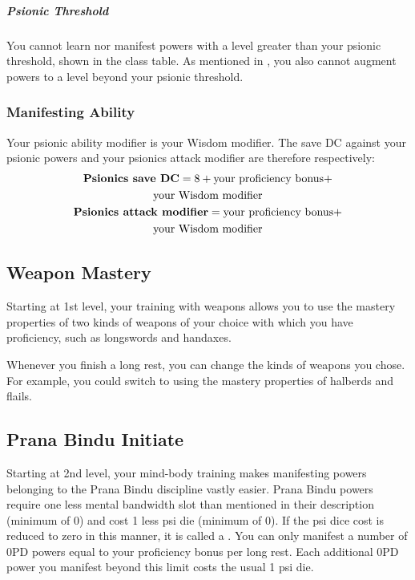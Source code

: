 \subparagraph{Psionic Threshold}
You cannot learn nor manifest powers with a level
greater than your psionic threshold,
shown in the class table.
As mentioned in ,
you also cannot augment powers to a level
beyond your psionic threshold.

\subsubsection{Manifesting Ability}
Your psionic ability modifier is your Wisdom modifier.
The save DC against your psionic powers and your
psionics attack modifier are therefore respectively:
\small\begin{equation*}
    \begin{gathered}
        \text{\textbf{Psionics save DC}}
            = 8 + \text{your proficiency bonus} + \\
                  \text{your Wisdom modifier} \\
        \text{\textbf{Psionics attack modifier}}
            = \text{your proficiency bonus} + \\
              \text{your Wisdom modifier}
    \end{gathered}
\end{equation*}\normalsize

\subsection{Weapon Mastery}
Starting at 1st level,
your training with weapons allows you to use the mastery properties
of two kinds of weapons of your choice with which you have proficiency,
such as longswords and handaxes.

Whenever you finish a long rest,
you can change the kinds of weapons you chose.
For example, you could switch to using the mastery properties of
halberds and flails.

\subsection{Prana Bindu Initiate}
Starting at 2nd level,
your mind-body training makes manifesting powers
belonging to the Prana Bindu discipline
vastly easier.
Prana Bindu powers require one less mental bandwidth slot
than mentioned in their description (minimum of 0)
and cost 1 less psi die (minimum of 0).
If the psi dice cost is reduced to zero in this manner,
it is called a .
You can only manifest a number of 0PD powers
equal to your proficiency bonus per long rest.
Each additional 0PD power you manifest
beyond this limit costs the usual 1 psi die.

